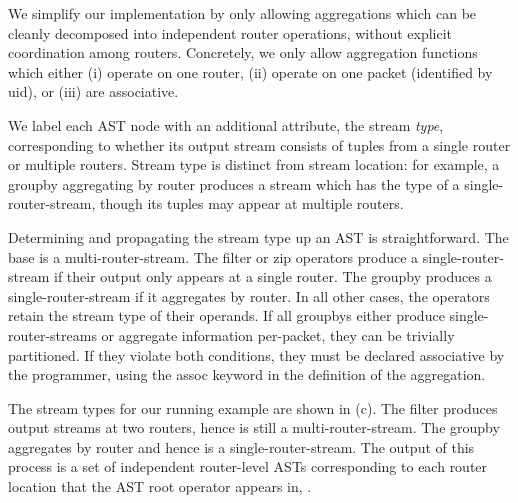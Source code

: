 We simplify our implementation by only allowing aggregations which can be
cleanly decomposed into independent router operations, without explicit
coordination among routers.
Concretely, we only allow aggregation functions which either (i) operate on one
router, (ii) operate on one packet (identified by {\ct uid}), or (iii)
are associative.

We label each AST node with an additional attribute, the stream {\em type},
corresponding to whether its output stream consists of tuples from a single
router or multiple routers. Stream type is distinct from stream location: for
example, a {\ct groupby} aggregating by {\ct router} produces a stream which has
the type of a single-router-stream, though its tuples may appear at multiple
routers.

Determining and propagating the stream type up an AST is straightforward. The
base {\ct \pktlog} is a multi-router-stream. The {\ct filter} or {\ct zip}
operators produce a single-router-stream if their output only appears at a
single router. The {\ct groupby} produces a single-router-stream if it
aggregates by {\ct router.} In all other cases, the operators retain the stream
type of their operands. If all {\ct groupby}s either produce
single-router-streams or aggregate information per-packet, they can be trivially
partitioned. If they violate both conditions, they must be declared associative
by the programmer, using the {\ct assoc} keyword in the definition of the
aggregation.

The stream types for our running example are shown in
(c). The {\ct filter} produces output streams at
two routers, hence is still a multi-router-stream. The {\ct groupby} aggregates
by {\ct router} and hence is a single-router-stream. The output of this process
is a set of independent router-level ASTs corresponding to each router location
that the AST root operator appears in, .



